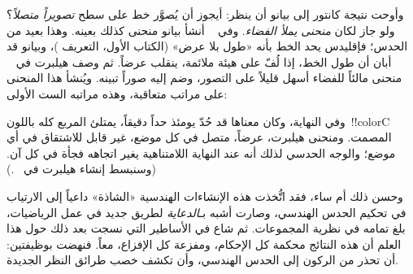 \documentclass[../../../include/open-logic-section]{subfiles}
\begin{document}
وأوحت نتيجة كانتور إلى بيانو أن ينظر: أيجوز أن يُصوَّر خط على سطح
\emph{تصويراً متصلاً}؟ ولو جاز لكان \emph{منحنى يملأ الفضاء}. وفي
~\citeyear{Peano1890} أنشأ بيانو منحنى كذلك بعينه. وهذا بعيد من الحدس؛
فإقليدس يحد الخط بأنه «طول بلا عرض» (الكتاب الأول، التعريف )، وبيانو قد
أبان أن طول الخط، إذا لُفّ على هيئة ملائمة، ينقلب عرضاً. ثم وصف هيلبرت في
~\citeyear{Hilbert1891} منحنى مالئاً للفضاء أسهل قليلاً على التصور، وضم
إليه صوراً تبينه. ويُنشأ هذا المنحنى على مراتب متعاقبة، وهذه مراتبه الست
الأولى:
\begin{center}
\end{center}
وفي النهاية، وكان معناها قد حُدّ يومئذ حداً دقيقاً، يمتلئ المربع كله
باللون~!!{colorC} المصمت. ومنحنى هيلبرت، عرضاً، متصل في كل موضع، غير قابل
للاشتقاق في أي موضع؛ والوجه الحدسي لذلك أنه عند النهاية اللامتناهية يغير
اتجاهه فجأة في كل آن. (وسنبسط إنشاء هيلبرت في
~.)

وحسن ذلك أم ساء، فقد اتُّخذت هذه الإنشاءات الهندسية «الشاذة» داعياً إلى
الارتياب في تحكيم الحدس الهندسي، وصارت أشبه بـ\emph{الدعاية} لطريق جديد
في عمل الرياضيات، بلغ تمامه في نظرية المجموعات. ثم شاع في الأساطير التي
نسجت بعد ذلك حول هذا العلم أن هذه النتائج محكمة كل الإحكام، ومفزعة كل
الإفزاع، معاً. فنهضت بوظيفتين: أن تحذر من الركون إلى الحدس الهندسي، وأن
تكشف خصب طرائق النظر الجديدة.
\end{document}
